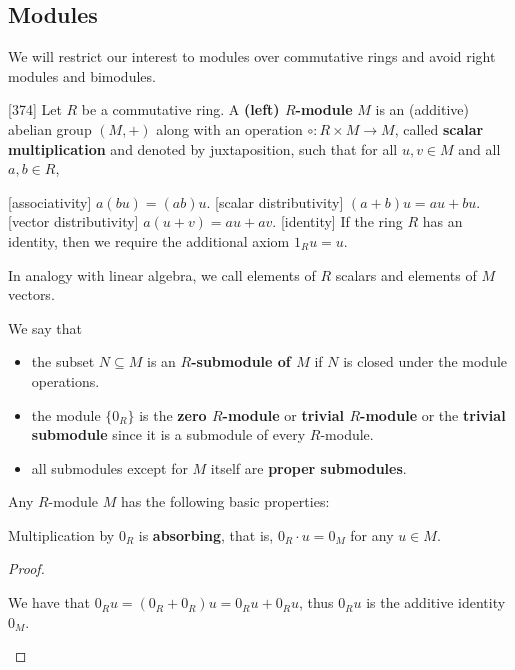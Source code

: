 \subsection{Modules}\label{subsec:modules}

\begin{note}\label{note:module_over_commutative_ring}
  We will restrict our interest to modules over commutative rings and avoid right modules and bimodules.
\end{note}

\begin{definition}\label{def:module}\cite{Knapp2016BAlg}[374]
  Let \( R \) be a commutative ring. A \textbf{(left) \( R \)-module} \( M \) is an (additive) abelian group \( (M, +) \) along with an operation \( \circ: R \times M \to M \), called \textbf{scalar multiplication} and denoted by juxtaposition, such that for all \( u, v \in M \) and all \( a, b \in R \),
  \begin{description}
    [associativity] \( a (b u) = (a b) u \).
    [scalar distributivity] \( (a + b) u = a u + b u \).
    [vector distributivity] \( a (u + v) = a u + a v \).
    [identity] If the ring \( R \) has an identity, then we require the additional axiom \( 1_R u = u \).
  \end{description}

  In analogy with linear algebra, we call elements of \( R \) scalars and elements of \( M \) vectors.

  We say that
  \begin{itemize}
    \item the subset \( N \subseteq M \) is an \textbf{\( R \)-submodule of \( M \)} if \( N \) is closed under the module operations.
    \item the module \( \{ 0_R \} \) is the \textbf{zero \( R \)-module} or \textbf{trivial \( R \)-module} or the \textbf{trivial submodule} since it is a submodule of every \( R \)-module.
    \item all submodules except for \( M \) itself are \textbf{proper submodules}.
  \end{itemize}
\end{definition}

\begin{proposition}\label{def:module_properties}
  Any \( R \)-module \( M \) has the following basic properties:
  \begin{defenum}
     Multiplication by \( 0_R \) is \textbf{absorbing}, that is, \( 0_R \cdot u = 0_M \) for any \( u \in M \).
  \end{defenum}
\end{proposition}
\begin{proof}\mbox{}
  \begin{itemize}
     We have that \( 0_R u = (0_R + 0_R)u = 0_R u + 0_R u \), thus \( 0_R u \) is the additive identity \( 0_M \).
  \end{itemize}
\end{proof}

